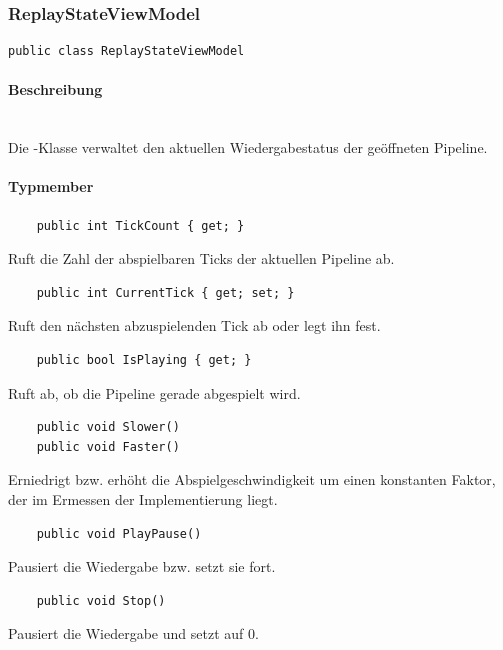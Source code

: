 \subsubsection{ReplayStateViewModel}

\begin{verbatim}
public class ReplayStateViewModel
\end{verbatim}

\paragraph{Beschreibung}~\\
Die -Klasse verwaltet den aktuellen Wiedergabestatus der geöffneten Pipeline.

\paragraph{Typmember}
\begin{itemize}

	\begin{verbatim}
	public int TickCount { get; }
	\end{verbatim}
	Ruft die Zahl der abspielbaren Ticks der aktuellen Pipeline ab.

	\begin{verbatim}
	public int CurrentTick { get; set; }
	\end{verbatim}
	Ruft den nächsten abzuspielenden Tick ab oder legt ihn fest.

	\begin{verbatim}
	public bool IsPlaying { get; }
	\end{verbatim}
	Ruft ab, ob die Pipeline gerade abgespielt wird.

	\begin{verbatim}
	public void Slower()
	public void Faster()
	\end{verbatim}
	Erniedrigt bzw. erhöht die Abspielgeschwindigkeit um einen konstanten Faktor, der im Ermessen der Implementierung liegt.

	\begin{verbatim}
	public void PlayPause()
	\end{verbatim}
	Pausiert die Wiedergabe bzw. setzt sie fort.

	\begin{verbatim}
	public void Stop()
	\end{verbatim}
	Pausiert die Wiedergabe und setzt  auf 0.

\end{itemize}

